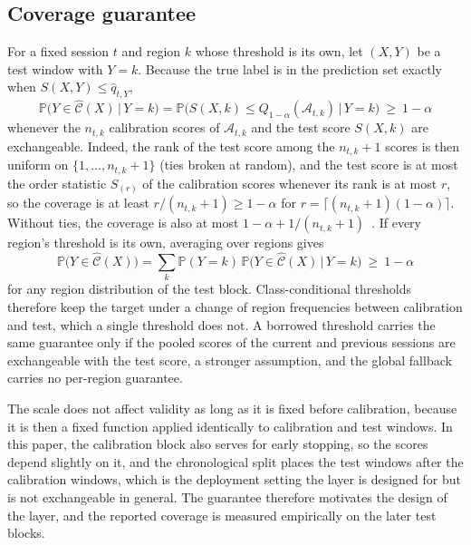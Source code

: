 \documentclass{article}
\begin{document}
\subsection{Coverage guarantee}
\label{app:guarantee}
For a fixed session $t$ and region $k$ whose threshold is its own, let $(X,Y)$ be a test window with $Y=k$. Because the true label is in the prediction set exactly when $S(X,Y)\le\hat q_{t,Y}$,
\begin{equation}
  \mathbb{P}\big(Y\in\widehat{\mathcal{C}}(X)\,\big|\,Y=k\big)=\mathbb{P}\big(S(X,k)\le Q_{1-\alpha}(\mathcal{A}_{t,k})\,\big|\,Y=k\big)\ \ge\ 1-\alpha
\end{equation}
whenever the $n_{t,k}$ calibration scores of $\mathcal{A}_{t,k}$ and the test score $S(X,k)$ are exchangeable. Indeed, the rank of the test score among the $n_{t,k}+1$ scores is then uniform on $\{1,\ldots,n_{t,k}+1\}$ (ties broken at random), and the test score is at most the order statistic $S_{(r)}$ of the calibration scores whenever its rank is at most $r$, so the coverage is at least $r/(n_{t,k}+1)\ge1-\alpha$ for $r=\lceil(n_{t,k}+1)(1-\alpha)\rceil$. Without ties, the coverage is also at most $1-\alpha+1/(n_{t,k}+1)$~\cite{angelopoulos2022a}. If every region's threshold is its own, averaging over regions gives
\begin{equation}
  \mathbb{P}\big(Y\in\widehat{\mathcal{C}}(X)\big)=\sum_{k}\mathbb{P}(Y=k)\,\mathbb{P}\big(Y\in\widehat{\mathcal{C}}(X)\,\big|\,Y=k\big)\ \ge\ 1-\alpha
\end{equation}
for any region distribution of the test block. Class-conditional thresholds therefore keep the target under a change of region frequencies between calibration and test, which a single threshold does not. A borrowed threshold carries the same guarantee only if the pooled scores of the current and previous sessions are exchangeable with the test score, a stronger assumption, and the global fallback carries no per-region guarantee.

The scale does not affect validity as long as it is fixed before calibration, because it is then a fixed function applied identically to calibration and test windows. In this paper, the calibration block also serves for early stopping, so the scores depend slightly on it, and the chronological split places the test windows after the calibration windows, which is the deployment setting the layer is designed for but is not exchangeable in general. The guarantee therefore motivates the design of the layer, and the reported coverage is measured empirically on the later test blocks.
\end{document}
